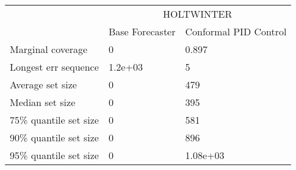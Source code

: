 \begin{tabular}{lll}
\toprule
& \multicolumn{2}{c}{HOLTWINTER} \\
& Base Forecaster & Conformal PID Control \\
\midrule
Marginal coverage & 0 & 0.897 \\
Longest err sequence & 1.2e+03 & 5 \\
Average set size & 0 & 479 \\
Median set size & 0 & 395 \\
75\% quantile set size & 0 & 581 \\
90\% quantile set size & 0 & 896 \\
95\% quantile set size & 0 & 1.08e+03 \\
\bottomrule
\end{tabular}
